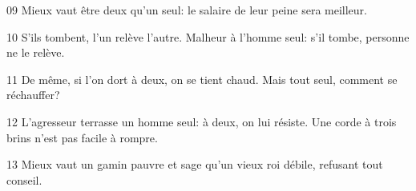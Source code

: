 
09 Mieux vaut être deux qu’un seul: le salaire de leur peine sera meilleur.

10 S’ils tombent, l’un relève l’autre. Malheur à l’homme seul: s’il tombe, personne ne le relève.

11 De même, si l’on dort à deux, on se tient chaud. Mais tout seul, comment se réchauffer?

12 L’agresseur terrasse un homme seul: à deux, on lui résiste. Une corde à trois brins n’est pas facile à rompre.

13 Mieux vaut un gamin pauvre et sage qu’un vieux roi débile, refusant tout conseil.